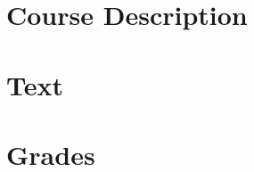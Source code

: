 \documentclass[11pt,article]{memoir}
\begin{document}
\maketitle

\section*{Course Description}

\section*{Text}

\section*{Grades}
\end{document}
